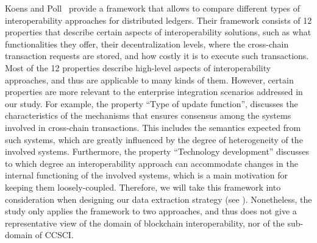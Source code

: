 \documentclass[review]{elsarticle}
\begin{document}
Koens and Poll~\cite{Koens2019Assessing} provide a framework that allows to compare different types of interoperability approaches for distributed ledgers.
Their framework consists of 12 properties that describe certain aspects of interoperability solutions, such as what functionalities they offer, their decentralization levels, where the cross-chain transaction requests are stored, and how costly it is to execute such transactions.
Most of the 12 properties describe high-level aspects of interoperability approaches, and thus are applicable to many kinds of them.
However, certain properties are more relevant to the enterprise integration scenarios addressed in our study.
For example, the property \enquote{Type of update function}, discusses the characteristics of the mechanisms that ensures consensus among the systems involved in cross-chain transactions.
This includes the semantics expected from such systems, which are greatly influenced by the degree of heterogeneity of the involved systems.
Furthermore, the property \enquote{Technology development} discusses to which degree an interoperability approach can accommodate changes in the internal functioning of the involved systems, which is a main motivation for keeping them loosely-coupled.
Therefore, we will take this framework into consideration when designing our data extraction strategy (see ).
Nonetheless, the study only applies the framework to two approaches, and thus does not give a representative view of the domain of blockchain interoperability, nor of the sub-domain of CCSCI.
\end{document}
